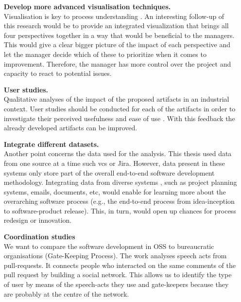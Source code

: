 \begin{enumerate}
	\item[\bfseries Develop more advanced visualisation techniques.]\\
	Visualisation is key to process understanding \citep{DBLP:journals/corr/abs-2202-07941}. An interesting follow-up of this research would be to provide an integrated visualization that brings all four perspectives together in a way that would be beneficial to the managers. This would give a clear bigger picture of the impact of each perspective and let the manager decide which of these to prioritize when it comes to improvement. Therefore, the manager has more control over the project and capacity to react to potential issues. 
	
	\item[\bfseries User studies.]\\
	
	Qualitative analyses of the impact of the proposed artifacts in an industrial context. User studies should be conducted for each of the artifacts in order to investigate their perceived usefulness and ease of use \citep{DBLP:journals/misq/VenkateshMDD03}. With this feedback the already developed artifacts can be improved. 
	
	\item[\bfseries Integrate different datasets.]\\
	 
	Another point concerns the data used for the analysis. This thesis used data from one source at a time such \gls{vcs} or Jira. However, data present in these systems only store part of the overall end-to-end software development methodology. Integrating data from diverse systems \citep{DBLP:conf/icse/TrautschTHLG20}, such as project planning systems, emails, documents, etc, would enable for learning more about the overarching software process (e.g., the end-to-end process from idea-inception to software-product release). This, in turn, would open up chances for process redesign or innovation. 
	
	\item[\bfseries Coordination studies]\\
	
	We want to compare the software development in OSS to bureaucratic organisations (Gate-Keeping Process). The work analyses speech acts from pull-requests. It connects people who interacted on the same comments of the pull request by building a social network. This allows us to identify the type of user by means of the speech-acts they use and gate-keepers because they are probably at the centre of the network. 
	

\end{enumerate}
